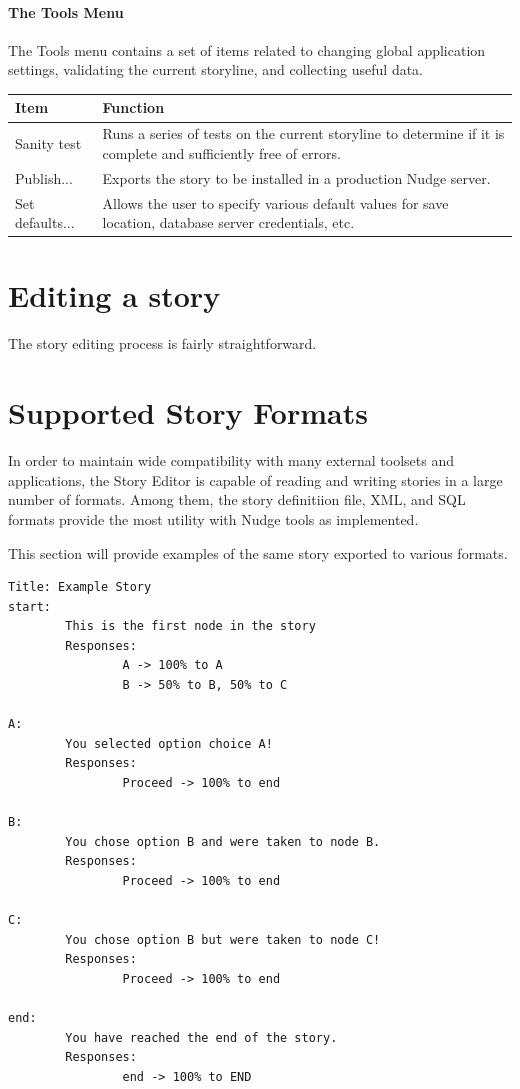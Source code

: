 \documentclass[12pt,letterpaper]{article}
\begin{document}
\paragraph{The Tools Menu}
The Tools menu contains a set of items related to changing global application settings, validating the current storyline, and collecting useful data.

\begin{center}
    \begin{tabular}{l|p{4in}}
    Item & Function\\ \hline \hline
    Sanity test & Runs a series of tests on the current storyline to determine if it is complete and sufficiently free of errors.\\ \hline
    Publish... & Exports the story to be installed in a production Nudge server.\\ \hline
    Set defaults... & Allows the user to specify various default values for save location, database server credentials, etc.\\ \hline
    \end{tabular}
\end{center}

\section{Editing a story}
The story editing process is fairly straightforward. 

\section{Supported Story Formats}
In order to maintain wide compatibility with many external toolsets and applications, the Story Editor is capable of reading and writing stories in a large number of formats.
Among them, the story definitiion file, XML, and SQL formats provide the most utility with Nudge tools as implemented.

This section will provide examples of the same story exported to various formats.

\lstset{numbers=left, frame=shadowbox}
\begin{lstlisting}[breaklines=true, caption=Example story in story format.]
Title: Example Story
start:
        This is the first node in the story
        Responses:
                A -> 100% to A
                B -> 50% to B, 50% to C

A:
        You selected option choice A!
        Responses:
                Proceed -> 100% to end

B:
        You chose option B and were taken to node B.
        Responses:
                Proceed -> 100% to end

C:
        You chose option B but were taken to node C!
        Responses:
                Proceed -> 100% to end

end:
        You have reached the end of the story.
        Responses:
                end -> 100% to END
\end{lstlisting}
\end{document}
